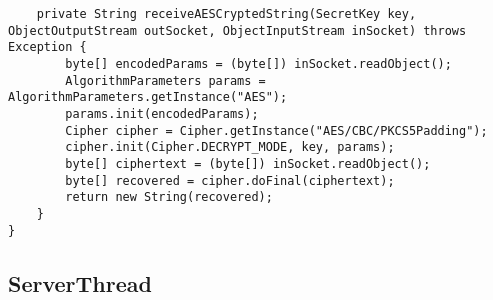 \documentclass[12pt]{article}
\begin{document}
\begin{lstlisting}
	private String receiveAESCryptedString(SecretKey key, ObjectOutputStream outSocket, ObjectInputStream inSocket) throws Exception {
		byte[] encodedParams = (byte[]) inSocket.readObject();
		AlgorithmParameters params = AlgorithmParameters.getInstance("AES");
		params.init(encodedParams);
		Cipher cipher = Cipher.getInstance("AES/CBC/PKCS5Padding");
		cipher.init(Cipher.DECRYPT_MODE, key, params);
		byte[] ciphertext = (byte[]) inSocket.readObject();
		byte[] recovered = cipher.doFinal(ciphertext);
		return new String(recovered);
	}
}

\end{lstlisting}

\subsection*{ServerThread}
\end{document}
